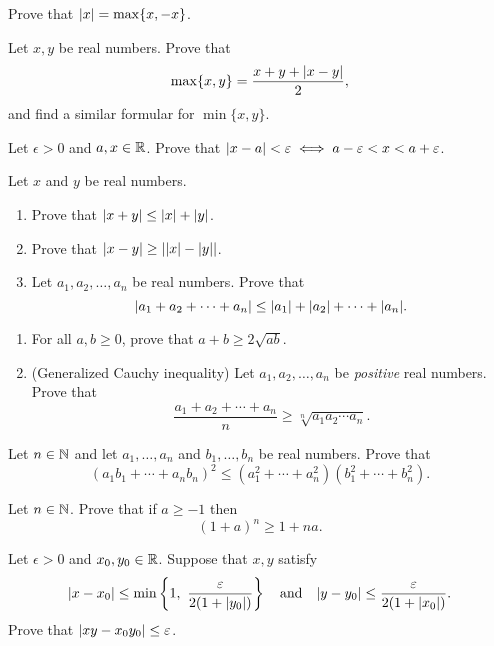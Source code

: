 \documentclass[10pt, a4paper]{article}
\begin{document}
{}

\begin{exercise}
  Prove that \(\abs{x} = \max\{x, -x\}\).
\end{exercise}

\begin{exercise}
  Let \(x,y\) be real numbers. Prove that 
  \[\max\{x,y\} = \frac{x+y+\abs{x-y}}{2}, \]
  and find a similar formular for \(\min\{x,y\}\).
\end{exercise}

\begin{exercise}
  Let \(\epsilon>0\) and \(a,x\in\R\). Prove that
  \(\abs{x-a}<\epsilon \iff a-\epsilon< x< a+\epsilon\).
\end{exercise}

\begin{exercise}
  Let \(x\) and \(y\) be real numbers.
  \begin{enumerate}
  \item Prove that \(\abs{x + y} \leq \abs{x} + \abs{y}\).
  \item Prove that \(\abs{x - y} \geq \abs*{ \abs{x}-\abs{y} }\).
  \item Let \(a_1, a_2, \dots, a_n\) be real numbers. Prove that
    \[\abs{a_1+a_2+\cdots+a_n}\leq \abs{a_1}+\abs{a_2}+\cdots + \abs{a_n}.\]
  \end{enumerate}
\end{exercise}


\begin{exercise}\text{}
  \begin{enumerate}
  \item For all \(a,b \geq 0\), prove that \(a + b\geq 2\sqrt{ab}\).
  \item (Generalized Cauchy inequality)
    Let \(a_1,a_2,\dots,a_n\) be \emph{positive} real numbers. Prove that
    \[\frac{a_1+a_2+\cdots+a_n}{n} \geq \sqrt[n]{a_1a_2\cdots a_n}.\]
  \end{enumerate}
\end{exercise}

\begin{exercise}
  Let \(n\in\N\) and let \(a_1,\dots,a_n\) and \(b_1,\dots,b_n\) be real numbers.
  Prove that
  \[
    (a_1b_1+\cdots +a_nb_n)^2 \leq (a_1^2+\cdots+a_n^2)(b_1^2+\cdots+b_n^2).
  \]
\end{exercise}




\begin{exercise}
  Let \(n\in\N\). Prove that if \(a\geq -1\) then \[(1+a)^n \geq 1+na.\]
\end{exercise}


\begin{exercise}
  Let \(\epsilon>0\) and \(x_0,y_0\in\R\). Suppose that \(x,y\) satisfy
  \[
    \abs{x-x_0}\leq\min\left\{1,~\frac{\epsilon}{2(1+\abs{y_0})}\right\}
    \quad\text{and}\quad
    \abs{y-y_0}\leq \frac{\epsilon}{2(1+\abs{x_0})}.
  \]
  Prove that \(\abs{xy - x_0y_0}\leq \epsilon\).
\end{exercise}
\end{document}
